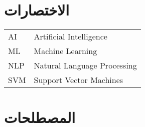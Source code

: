 

\chapter*{الاختصارات}

\begin{doublespacing}
	\begin{center}
		\begin{english}
			\begin{tabular}{l l}
				
				\indent
				AI		&		Artificial Intelligence \\
				
				\indent
				ML		&		Machine Learning \\
				
				\indent
				NLP		&		Natural Language Processing \\
				
				\indent
				SVM		&		Support Vector Machines \\
				
			\end{tabular}
		\end{english}
	\end{center}
\end{doublespacing}


\chapter*{المصطلحات}

